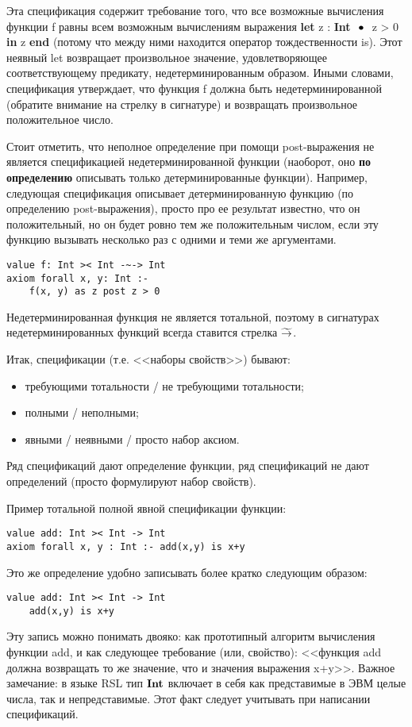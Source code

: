 Эта спецификация содержит требование того, что все возможные вычисления функции f равны всем возможным вычислениям выражения \textbf{let} z : \textbf{Int} $~\mathop{\bullet}~$ z > 0 \textbf{in} z \textbf{end} (потому что между ними находится оператор тождественности is). Этот неявный let возвращает произвольное значение, удовлетворяющее соответствующему предикату, недетерминированным образом. Иными словами, спецификация утверждает, что функция f должна быть недетерминированной (обратите внимание на стрелку в сигнатуре) и возвращать произвольное положительное число.

Стоит отметить, что неполное определение при помощи post-выражения не является спецификацией недетерминированной функции (наоборот, оно \textbf{по определению} описывать только детерминированные функции). Например, следующая спецификация описывает детерминированную функцию (по определению post-выражения), просто про ее результат известно, что он положительный, но он будет ровно тем же положительным числом, если эту функцию вызывать несколько раз с одними и теми же аргументами.
\begin{lstlisting}
value f: Int >< Int -~-> Int
axiom forall x, y: Int :-
    f(x, y) as z post z > 0
\end{lstlisting}

Недетерминированная функция не является тотальной, поэтому в сигнатурах недетерминированных функций всегда ставится стрелка $\widetilde{\rightarrow}$.



Итак, спецификации (т.е. <<наборы свойств>>) бывают:
\begin{itemize}
  \item требующими тотальности / не требующими тотальности;
  \item полными / неполными;
  \item явными / неявными / просто набор аксиом.
\end{itemize}

Ряд спецификаций дают определение функции, ряд спецификаций не дают определений (просто формулируют набор свойств).

Пример тотальной полной явной спецификации функции:
\begin{lstlisting}
value add: Int >< Int -> Int
axiom forall x, y : Int :- add(x,y) is x+y
\end{lstlisting}

Это же определение удобно записывать более кратко следующим образом:
\begin{lstlisting}
value add: Int >< Int -> Int
    add(x,y) is x+y
\end{lstlisting}
Эту запись можно понимать двояко: как прототипный алгоритм вычисления функции add, и как следующее требование (или, свойство): <<функция add должна возвращать то же значение, что и значения выражения x+y>>. Важное замечание: в языке RSL тип $\textbf{Int}$ включает в себя как представимые в ЭВМ целые числа, так и непредставимые. Этот факт следует учитывать при написании спецификаций.

